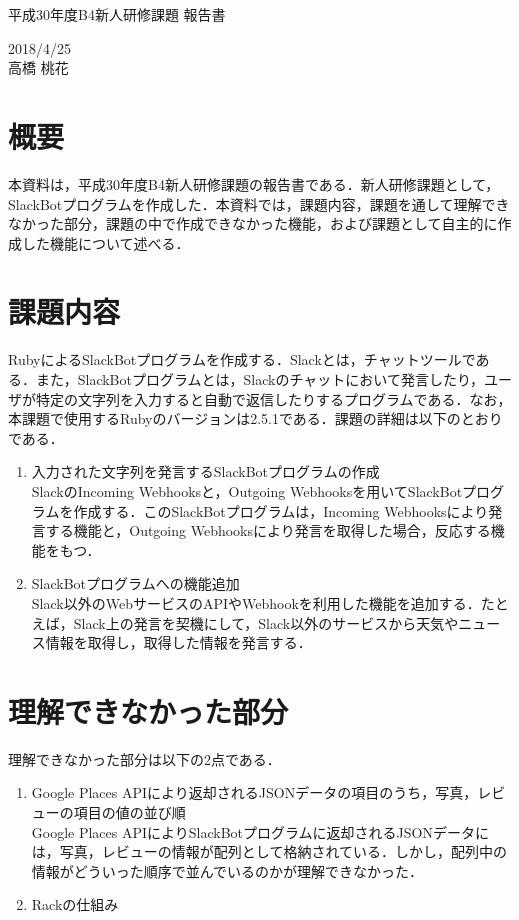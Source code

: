 \documentclass[12pt]{jsarticle}
\begin{document}
\begin{center}
{\LARGE 平成30年度B4新人研修課題 報告書}
\end{center}

\begin{flushright}
  2018/4/25\\
  高橋 桃花
\end{flushright}
\section{概要}
\label{sec:introduction}
本資料は，平成30年度B4新人研修課題の報告書である．新人研修課題として，SlackBotプログラムを作成した．本資料では，課題内容，課題を通して理解できなかった部分，課題の中で作成できなかった機能，および課題として自主的に作成した機能について述べる．

\section{課題内容}
RubyによるSlackBotプログラムを作成する．Slack\cite{slack}とは，チャットツールである．また，SlackBotプログラムとは，Slackのチャットにおいて発言したり，ユーザが特定の文字列を入力すると自動で返信したりするプログラムである．なお，本課題で使用するRubyのバージョンは2.5.1である．課題の詳細は以下のとおりである．
\begin{enumerate}
\item 入力された文字列を発言するSlackBotプログラムの作成\\
  SlackのIncoming Webhooksと，Outgoing Webhooksを用いてSlackBotプログラムを作成する．このSlackBotプログラムは，Incoming Webhooksにより発言する機能と，Outgoing Webhooksにより発言を取得した場合，反応する機能をもつ．
\item SlackBotプログラムへの機能追加 \\
  Slack以外のWebサービスのAPIやWebhookを利用した機能を追加する．たとえば，Slack上の発言を契機にして，Slack以外のサービスから天気やニュース情報を取得し，取得した情報を発言する．
\end{enumerate}

\section{理解できなかった部分}
理解できなかった部分は以下の2点である．

\begin{enumerate}
\item Google Places API\cite{placesapi}により返却されるJSONデータの項目のうち，写真，レビューの項目の値の並び順\\
  Google Places APIによりSlackBotプログラムに返却されるJSONデータには，写真，レビューの情報が配列として格納されている．しかし，配列中の情報がどういった順序で並んでいるのかが理解できなかった．
\item Rackの仕組み
\end{enumerate}
\end{document}
